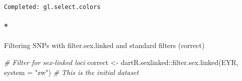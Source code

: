\documentclass[
  letterpaper,
  DIV=11,
  numbers=noendperiod]{scrreprt}
\let\oldparagraph\paragraph
\renewcommand{\paragraph}[1]{\oldparagraph{#1}\mbox{}}
\newenvironment{Shaded}{\begin{snugshade}}{\end{snugshade}}
\newcommand{\AttributeTok}[1]{\textcolor[rgb]{0.49,0.56,0.16}{#1}}
\newcommand{\CommentTok}[1]{\textcolor[rgb]{0.38,0.63,0.69}{\textit{#1}}}
\newcommand{\FunctionTok}[1]{\textcolor[rgb]{0.02,0.16,0.49}{#1}}
\newcommand{\NormalTok}[1]{\textcolor[rgb]{0.00,0.44,0.13}{#1}}
\newcommand{\OtherTok}[1]{\textcolor[rgb]{0.00,0.44,0.13}{#1}}
\newcommand{\SpecialCharTok}[1]{\textcolor[rgb]{0.25,0.44,0.63}{#1}}
\newcommand{\StringTok}[1]{\textcolor[rgb]{0.25,0.44,0.63}{#1}}
\let\textttOrig\texttt
\renewcommand{\texttt}[1]{\textttOrig{\color{blue}{#1}}}
\begin{document}
\begin{figure}[H]

{\centering \texttt{[image: Session10\_SexLinkedMarkers\_files/figure-pdf/unnamed-chunk-13-6.pdf]}

}

\end{figure}

\begin{verbatim}
Completed: gl.select.colors 
\end{verbatim}

\hypertarget{filtering-snps-with-filter.sex.linked-and-standard-filters-correct}{%
\paragraph*{Filtering SNPs with filter.sex.linked and standard filters
(correct)}\label{filtering-snps-with-filter.sex.linked-and-standard-filters-correct}}

\begin{Shaded}
\begin{Highlighting}[]
\CommentTok{\# Filter for sex{-}linked loci}
\NormalTok{correct }\OtherTok{\textless{}{-}}\NormalTok{ dartR.sexlinked}\SpecialCharTok{::}\FunctionTok{filter.sex.linked}\NormalTok{(EYR, }\AttributeTok{system =} \StringTok{"zw"}\NormalTok{)  }\CommentTok{\# This is the initial dataset}
\end{Highlighting}
\end{Shaded}

\begin{figure}[H]

{\centering \texttt{[image: Session10\_SexLinkedMarkers\_files/figure-pdf/unnamed-chunk-14-1.pdf]}

}

\end{figure}

\begin{figure}[H]

{\centering \texttt{[image: Session10\_SexLinkedMarkers\_files/figure-pdf/unnamed-chunk-14-2.pdf]}

}

\end{figure}

\begin{figure}[H]

{\centering \texttt{[image: Session10\_SexLinkedMarkers\_files/figure-pdf/unnamed-chunk-14-3.pdf]}

}

\end{figure}
\end{document}
